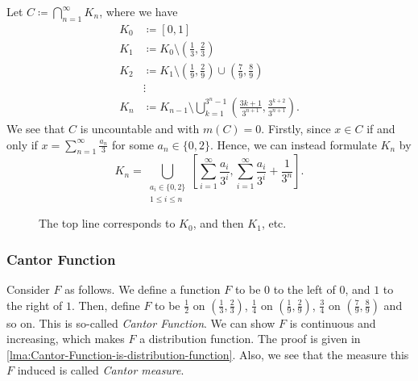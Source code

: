 \begin{eg}
	Let \(C \coloneqq \bigcap\limits_{n=1}^{\infty} K_{n}\), where we have
	\[
		\begin{split}
			K_0 &\coloneqq [0, 1]\\
			K_1 &\coloneqq K_{0}\setminus \left(\frac{1}{3}, \frac{2}{3}\right)\\
			K_2 &\coloneqq K_{1}\setminus \left(\frac{1}{9}, \frac{2}{9}\right) \cup \left(\frac{7}{9}, \frac{8}{9}\right)\\
			&\vdots\\
			K_n &\coloneqq K_{n-1}\setminus \bigcup\limits_{k=1}^{3^n - 1}\left(\frac{3k+1}{3^{n+1}}, \frac{3^{k+2}}{3^{n+1}}\right).
		\end{split}
	\]
	We see that \(C\) is uncountable and with \(m(C) = 0\). Firstly, since \(x\in C\) if and only if \(x = \sum\limits_{n=1}^{\infty} \frac{a_n}{3}\) for some \(a_n\in\{0, 2\}\).
	Hence, we can instead formulate \(K_{n}\) by
	\[
		K_{n} = \bigcup\limits_{\substack{a_{i}\in\{0, 2\}\\ 1\leq i\leq n}}\left[\sum\limits_{i=1}^{\infty} \frac{a_{i}}{3^i}, \sum\limits_{i=1}^{\infty} \frac{a_{i}}{3^i} + \frac{1}{3^n}\right].
	\]

	\begin{figure}[H]
		\centering
		\caption{The top line corresponds to \(K_0\), and then \(K_1\), etc.}
	\end{figure}
\end{eg}

\subsubsection{Cantor Function}\label{sssec:Cantor-Function}
Consider \(F\) as follows. We define a function \(F\) to be \(0\) to the left of \(0\),  and \(1\) to the right of \(1\). Then, define \(F\) to be \(\frac{1}{2}\)
on \(\left(\frac{1}{3}, \frac{2}{3}\right)\), \(\frac{1}{4}\) on \(\left(\frac{1}{9}, \frac{2}{9}\right)\), \(\frac{3}{4}\) on \(\left(\frac{7}{9}, \frac{8}{9}\right)\)
and so on. This is so-called \emph{Cantor Function}. We can show \(F\) is continuous and increasing, which makes \(F\) a distribution function. The proof is given in
\autoref{lma:Cantor-Function-is-distribution-function}. Also, we see that the measure this \(F\) induced is called \emph{Cantor measure}\label{def:Cantor-measure}.

